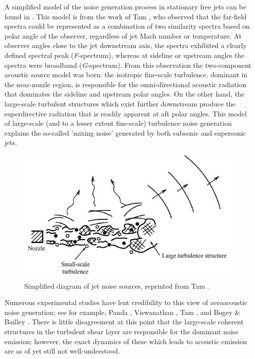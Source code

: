 A simplified model of the noise generation process in stationary free jets can be found in . 
This model is from the work of Tam \etal \citep{Tam1996, Tam2008}, who observed that the far-field spectra could be represented as a combination of two similarity spectra based on polar angle of the observer, regardless of jet Mach number or temperature.
At observer angles close to the jet downstream axis, the spectra exhibited a clearly defined spectral peak (\emph{F}-spectrum), whereas at sideline or upstream angles the spectra were broadband (\emph{G}-spectrum).
From this observation the two-component acoustic source model was born: the isotropic fine-scale turbulence, dominant in the near-nozzle region, is responsible for the omni-directional acoustic radiation that dominates the sideline and upstream polar angles. 
On the other hand, the large-scale turbulent structures which exist further downstream produce the superdirective radiation that is readily apparent at aft polar angles. 
This model of large-scale (and to a lesser extent fine-scale) turbulence noise generation explains the so-called 'mixing noise' generated by both subsonic and supersonic jets.
\begin{figure}
	\centering
	\includegraphics[width=5in]{Figures/JetNoiseSourceDiagramTMP.jpg}
	\caption{Simplified diagram of jet noise sources, reprinted from Tam \etal \citep{Tam2008a}.}
	\label{fig:jet_sources_diagram}
\end{figure}
Numerous experimental studies have lent credibility to this view of aeroacoustic noise generation; see for example, Panda \etal \citep{Panda2005}, Viswanathan \etal \citep{Viswanathan2010}, Tam \etal \citep{Tam2008}, and Bogey \& Bailley \citep{Bogey2007}.
There is little disagreement at this point that the large-scale coherent structures in the turbulent shear layer are responsible for the dominant noise emission; however, the exact dynamics of these which leads to acoustic emission are as of yet still not well-understood. 


